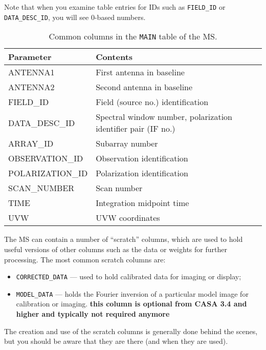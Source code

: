 Note that when you examine table entries for IDs such as {\tt FIELD\_ID} or 
{\tt DATA\_DESC\_ID}, you will see 0-based numbers.

\vspace{5mm}
\begin{table}[h!]
\caption[Common MS Columns]
        {\label{tabselect} Common columns in the {\tt MAIN} table of
        the MS.}
\begin{center}
\begin{tabular}{|ll|} \hline
{\bf Parameter}   &   {\bf Contents}                  \\
\hline
\hline
ANTENNA1      &   First antenna in baseline   \\
ANTENNA2      &   Second antenna in baseline  \\
FIELD\_ID      &   Field (source no.) identification  \\
DATA\_DESC\_ID  &   Spectral window number, polarization identifier pair (IF no.)  \\
ARRAY\_ID      &   Subarray number                \\
OBSERVATION\_ID  &   Observation identification   \\
POLARIZATION\_ID  &   Polarization identification \\ 
SCAN\_NUMBER   &   Scan number                    \\
TIME          &   Integration midpoint time      \\
UVW           &   UVW coordinates                \\
\hline
\end{tabular}
\end{center}
\end{table}

The MS can contain a number of ``scratch'' columns, which are used to
hold useful versions of other columns such as the data or weights
for further processing.  The most common scratch columns are:
\begin{itemize}
\item {\tt CORRECTED\_DATA} --- used to hold calibrated data for
  imaging or display;
\item {\tt MODEL\_DATA} --- holds the Fourier inversion of a
  particular model image for calibration or imaging. {\bf this column
    is optional from CASA 3.4 and higher and typically not required anymore}
\end{itemize}
The creation and use of the scratch columns is generally done behind the scenes, but you
should be aware that they are there (and when they are used).

